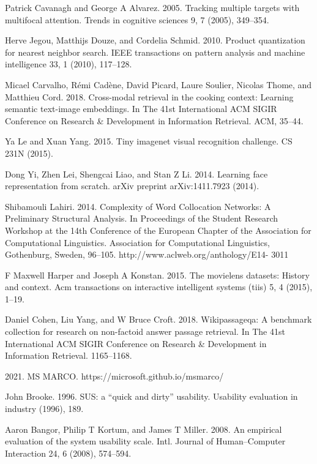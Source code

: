 \documentclass[11pt]{article}
\begin{document}
\begin{thebibliography}{10}
\begin{small}
 Patrick Cavanagh and George A Alvarez. 2005. Tracking multiple targets with multifocal attention. Trends in cognitive sciences 9, 7 (2005), 349–354.

 Herve Jegou, Matthijs Douze, and Cordelia Schmid. 2010. Product quantization for nearest neighbor search. IEEE transactions on pattern analysis and machine intelligence 33, 1 (2010), 117–128.

 Micael Carvalho, Rémi Cadène, David Picard, Laure Soulier, Nicolas Thome, and Matthieu Cord. 2018. Cross-modal retrieval in the cooking context: Learning semantic text-image embeddings. In The 41st International ACM SIGIR Conference on Research \& Development in Information Retrieval. ACM, 35–44.

 Ya Le and Xuan Yang. 2015. Tiny imagenet visual recognition challenge. CS
231N (2015).

 Dong Yi, Zhen Lei, Shengcai Liao, and Stan Z Li. 2014. Learning face representation from scratch. arXiv preprint arXiv:1411.7923 (2014).

 Shibamouli Lahiri. 2014. Complexity of Word Collocation Networks: A Preliminary Structural Analysis. In Proceedings of the Student Research Workshop at the 14th Conference of the European Chapter of the Association for Computational Linguistics. Association for Computational Linguistics, Gothenburg, Sweden,
96–105. http://www.aclweb.org/anthology/E14- 3011

 F Maxwell Harper and Joseph A Konstan. 2015. The movielens datasets: History and context. Acm transactions on interactive intelligent systems (tiis) 5, 4 (2015), 1–19.

 Daniel Cohen, Liu Yang, and W Bruce Croft. 2018. Wikipassageqa: A benchmark collection for research on non-factoid answer passage retrieval. In The 41st International ACM SIGIR Conference on Research \& Development in Information Retrieval. 1165–1168.

 2021. MS MARCO. https://microsoft.github.io/msmarco/

 John Brooke. 1996. SUS: a ``quick and dirty'' usability. Usability evaluation in industry (1996), 189.

 Aaron Bangor, Philip T Kortum, and James T Miller. 2008. An empirical evaluation
of the system usability scale. Intl. Journal of Human–Computer Interaction 24, 6 (2008), 574–594.


\end{small}
\end{thebibliography}
\end{document}
